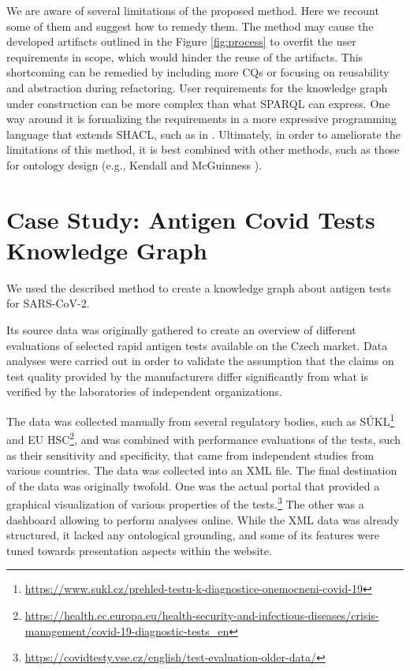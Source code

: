 \documentclass[
]{ceurart}
\begin{document}
We are aware of several limitations of the proposed method. Here we recount some of them and suggest how to remedy them. The method may cause the developed artifacts outlined in the Figure \ref{fig:process} to overfit the user requirements in scope, which would hinder the reuse of the artifacts. This shortcoming can be remedied by including more CQs or focusing on reusability and abstraction during refactoring. User requirements for the knowledge graph under construction can be more complex than what SPARQL can express. One way around it is formalizing the requirements in a more expressive programming language that extends SHACL, such as in \cite{SHACLJS2017}. Ultimately, in order to ameliorate the limitations of this method, it is best combined with other methods, such as those for ontology design (e.g., Kendall and McGuinness \cite{Kendall2019}).

\section{Case Study: Antigen Covid Tests Knowledge Graph}

We used the described method to create a knowledge graph about antigen tests for SARS-CoV-2.

Its source data was originally gathered to create an overview of different evaluations of selected rapid antigen tests available on the Czech market.
Data analyses were carried out \cite{Kliegr2022} in order to validate the assumption that the claims on test quality provided by the manufacturers differ significantly from what is verified by the laboratories of independent organizations.

The data was collected manually from several regulatory bodies, such as SÚKL\footnote{\url{https://www.sukl.cz/prehled-testu-k-diagnostice-onemocneni-covid-19}} and EU HSC\footnote{\url{https://health.ec.europa.eu/health-security-and-infectious-diseases/crisis-management/covid-19-diagnostic-tests_en}}, and was combined with performance evaluations of the tests, such as their sensitivity and specificity, that came from independent studies from various countries.
The data was collected into an XML file.
The final destination of the data was originally twofold.
One was the actual portal that provided a graphical visualization of various properties of the tests.\footnote{\url{https://covidtesty.vse.cz/english/test-evaluation-older-data/}}
The other was a dashboard allowing to perform analyses online.
While the XML data was already structured, it lacked any ontological grounding, and some of its features were tuned towards presentation aspects within the website.
\end{document}

